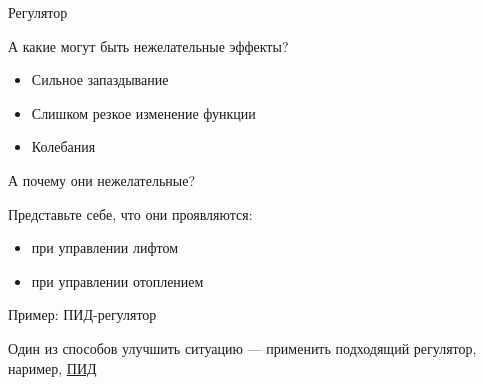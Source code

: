 \documentclass[xetex,aspectratio=43]{beamer}
\begin{document}
\begin{frame}{Регулятор}


А какие могут быть нежелательные эффекты?

\pause

\begin{itemize}
\tightlist
\item
  Сильное запаздывание
\item
  Слишком резкое изменение функции
\item
  Колебания
\end{itemize}

А почему они нежелательные?

\pause

Представьте себе, что они проявляются:

\begin{itemize}
\tightlist
\item
  при управлении лифтом
\item
  при управлении отоплением
\end{itemize}


\end{frame}

\begin{frame}{Пример: ПИД-регулятор}

Один из способов улучшить ситуацию --- применить подходящий регулятор, наример, \href{https://en.wikipedia.org/wiki/PID_controller}{ПИД}

\end{frame}

\postamble
\end{document}
